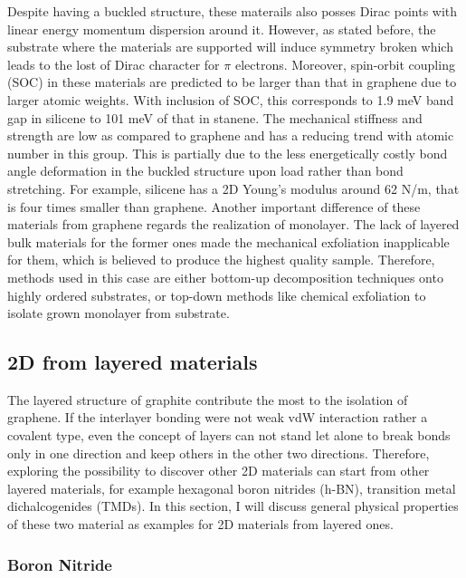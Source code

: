 Despite having a buckled structure, these materails also posses Dirac points with linear energy momentum dispersion around it\cite{Garcia2011}.  However, as stated before, the substrate where the materials are supported will induce symmetry broken which leads to the lost of Dirac character for $\pi$ electrons\cite{Lin2013}. Moreover, spin-orbit coupling (SOC) in these materials are predicted to be larger than that in graphene due to larger atomic weights. With inclusion of SOC, this corresponds to 1.9 meV band gap in silicene to 101 meV of that in stanene\cite{matthes2013}. The mechanical stiffness and strength are low as compared to graphene and has a reducing trend with atomic number in this group. This is partially due to the less energetically costly bond angle deformation in the buckled structure upon load rather than bond stretching\cite{Manjanath2014}. For example, silicene has a 2D Young's modulus around 62 \si{N/m}, that is four times smaller than graphene. Another important difference of these materials from graphene regards the realization of monolayer. The lack of layered bulk materials for the former ones made the mechanical exfoliation inapplicable for them, which is believed to produce the highest quality sample. Therefore, methods used in this case are either bottom-up decomposition techniques onto highly ordered substrates\cite{vogt2012,li2014}, or top-down methods like chemical exfoliation to isolate grown monolayer from substrate\cite{lin2012,kaloni2013}.


\subsection{2D from layered materials}

The layered structure of graphite contribute the most to the isolation of graphene. If the interlayer bonding were not weak vdW interaction rather a covalent type, even the concept of layers can not stand let alone to break bonds only in one direction and keep others in the other two directions. Therefore, exploring the possibility to discover other 2D materials can start from other layered materials, for example hexagonal boron nitrides (h-BN), transition metal dichalcogenides (TMDs). In this section, I will discuss general physical properties of these two material as examples for 2D materials from layered ones.

\subsubsection{Boron Nitride}

